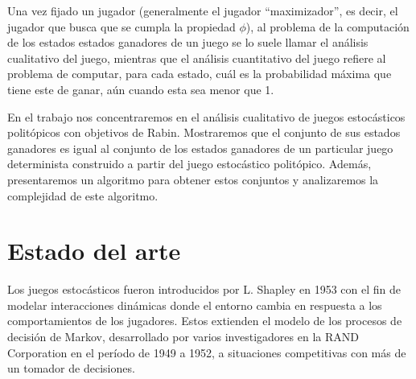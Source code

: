 Una vez fijado un jugador (generalmente el jugador ``maximizador'', es decir,
el jugador que busca que se cumpla la propiedad $\phi$), al problema de la
computación de los estados estados ganadores de un juego se lo suele llamar el
análisis cualitativo del juego, mientras que el análisis cuantitativo del juego
refiere al problema de computar, para cada estado, cuál es la probabilidad
máxima que tiene este de ganar, aún cuando esta sea menor que 1.

En el trabajo nos concentraremos en el análisis cualitativo de juegos
estocásticos politópicos con objetivos de Rabin. Mostraremos que el conjunto de
sus estados ganadores es igual al conjunto de los estados ganadores de un
particular juego determinista construido a partir del juego estocástico
politópico. Además, presentaremos un algoritmo para obtener estos conjuntos y
analizaremos la complejidad de este algoritmo.



\section{Estado del arte}

Los juegos estocásticos fueron introducidos por L. Shapley en 1953
\cite{Shapley1953} con el fin de modelar interacciones dinámicas donde el
entorno cambia en respuesta a los comportamientos de los jugadores. Estos
extienden el modelo de los procesos de decisión de Markov, desarrollado por
varios investigadores en la RAND Corporation en el período de 1949 a 1952, a
situaciones competitivas con más de un tomador de decisiones.


